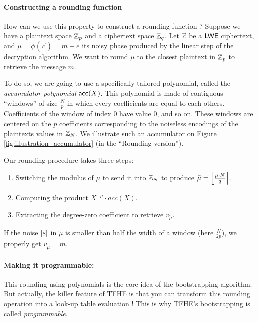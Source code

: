 \paragraph{Constructing a rounding function}
How can we use this property to construct a rounding function ? Suppose we have a plaintext space $\mathbb{Z}_p$ and a ciphertext space $\mathbb{Z}_q$. Let $\vec c$ be  a $\textsf{LWE}$ ciphertext, and $\mu = \phi(\vec c) = m + e$ its noisy phase produced by the linear step of the decryption algorithm. We want to round $\mu$ to the closest plaintext in $\mathbb{Z}_p$ to retrieve the message $m$.

To do so, we are going to use a specifically tailored polynomial, called the \textit{accumulator polynomial} $\textsf{acc}(X)$. This polynomial is made of contiguous ``windows'' of size $\frac N p$ in which every coefficients are equal to each others. Coefficients of the window of index 0 have value 0, and so on. These windows are centered on the $p$ coefficients corresponding to the noiseless encodings of the plaintexts values in $\mathbb{Z}_N$. We illustrate such an accumulator on Figure \ref{fig:illustration_accumulator} (in the ``Rounding version'').



Our rounding procedure takes three steps:

\begin{enumerate}%
	\item Switching the modulus of $\mu$ to send it into $\mathbb{Z}_N$ to produce $\tilde \mu = \left \lfloor \frac{\mu \cdot N}{q} \right \rceil$.
	\item Computing the product $X^{- \tilde \mu} \cdot acc(X)$.
	\item Extracting the degree-zero coefficient to retrieve $v_{\tilde \mu}$.
\end{enumerate}

If the noise $\left \lvert \tilde e \right \rvert$ in $\tilde \mu$ is smaller than half the width of a window (here $\frac{N}{2p}$), we properly get $v_{\tilde \mu} = m$. 

\paragraph{Making it programmable:}
This rounding using polynomials is the core idea of the bootstrapping algorithm. But actually, the killer feature of TFHE is that you can transform this rounding operation into a look-up table evaluation ! This is why TFHE's bootstrapping is called \textit{programmable}.

